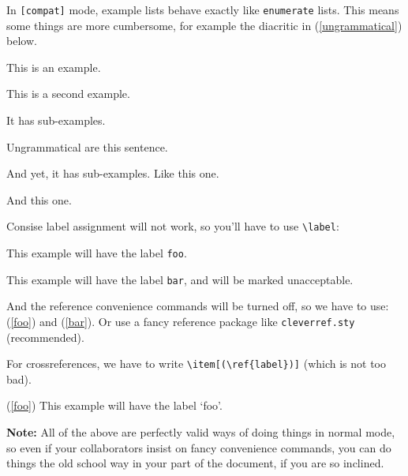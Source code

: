 \documentclass{article}
\begin{document}
%
\noindent In \verb|[compat]| mode, example lists behave exactly
like \verb|enumerate| lists. This means some things are more cumbersome,
for example the diacritic in (\ref{ungrammatical}) below.
    \begin{examples}
        \item This is an example.
        \item This is a second example.
              \begin{examples}
                  \item It has sub-examples.
                  \item \diacritic{*} Ungrammatical are this sentence.\label{ungrammatical}
                        \begin{examples}
                            \item And yet, it has sub-examples. Like this one.
                            \item And this one.
                        \end{examples}
              \end{examples}
    \end{examples}
Consise label assignment will not work, so you'll have to use \verb|\label|:
\begin{examples}
    \item\label{foo} This example will have the label \verb|foo|.
    \item\label{bar}\diacritic{\#} This example will have the label \verb|bar|, and will be marked 
                unacceptable.
\end{examples}
%
And the reference convenience commands will be turned off, so we have to use: 
(\ref{foo}) and (\ref{bar}). Or use a fancy reference package like \verb|cleverref.sty| (recommended).

For crossreferences, we have to write \verb|\item[(\ref{label})]| (which is not too bad).
\begin{examples}
    \item[(\ref{foo})] This example will have the label `foo'.
\end{examples}
%
\textbf{Note:} All of the above are perfectly valid ways of doing things in normal mode,
so even if your collaborators insist on fancy convenience commands, you can do things
the old school way in your part of the document, if you are so inclined.
\end{document}
